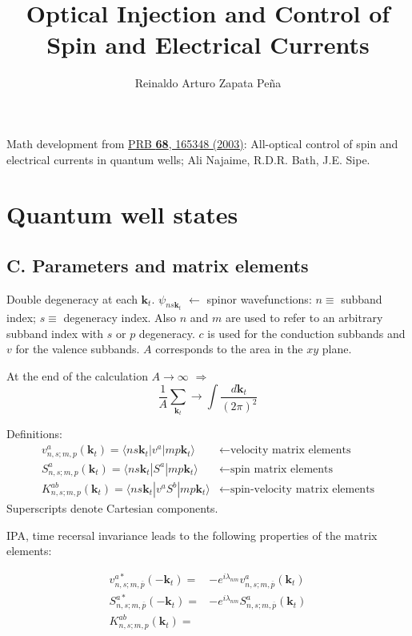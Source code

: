 \documentclass{article}
\title{Optical Injection and Control of Spin and Electrical Currents}
\author{Reinaldo Arturo Zapata Pe\~na}
\date{}
\newcommand{\kt}{\mathbf{k}_{t}}
\begin{document}
\maketitle

Math development from
\href{http://journals.aps.org/prb/abstract/10.1103/PhysRevB.68.165348}{PRB
\textbf{68}, 165348 (2003)}: All-optical control of spin and electrical currents
in quantum wells; Ali Najaime, R.D.R. Bath, J.E. Sipe.


\section{Quantum well states} %
\label{sec:quantum_well_states}

\subsection*{C. Parameters and matrix elements}

Double degeneracy at each $\kt$. $\psi_{ns\kt}$ $\leftarrow$ spinor
wavefunctions: $n \equiv$ subband index; $s\equiv$ degeneracy index. Also $n$
and $m$ are used to refer to an arbitrary subband index with $s$ or $p$
degeneracy. $c$ is used for the conduction subbands and $v$ for the valence
subbands. $A$ corresponds to the area in the $xy$ plane.

At the end of the calculation $A \rightarrow \infty$ $\Rightarrow$
\begin{equation*}
\frac{1}{A} \sum_{\kt} \rightarrow \int \frac{d\kt}{(2 \pi)^{2}} 
\end{equation*}

Definitions:
\begin{align*}
v_{n,s;m,p}^{a}(\kt) = \langle ns\kt | v^{a} |
mp\kt \rangle & \leftarrow \text{velocity matrix elements}\\
S_{n,s;m,p}^{a}(\kt) = \langle ns\kt | S^{a} |
mp\kt \rangle & \leftarrow \text{spin matrix elements}\\
K_{n,s;m,p}^{ab}(\kt)= \langle ns\kt | v^{a}S^{b} |
mp\kt \rangle & \leftarrow \text{spin-velocity matrix elements}
\end{align*}
Superscripts denote Cartesian components.

IPA, time recersal invariance leads to the following properties of the matrix
elements:

\begin{align*}
v_{n,s;m,\overline{p}}^{a*}(-\kt) =& -e^{i \lambda_{nm}} v_{n,s;m,\overline{p}}^{a}(\kt)\\
S_{n,s;m,\overline{p}}^{a*}(-\kt) =& -e^{i \lambda_{nm}} S_{n,s;m,\overline{p}}^{a}(\kt)\\
K_{n,s;m,p}^{ab}(\kt)= 
\end{align*}

\end{document}
